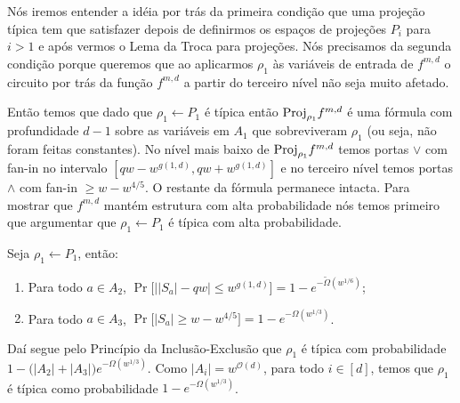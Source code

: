 Nós iremos entender a idéia por trás da primeira condição que uma projeção típica tem que satisfazer depois de definirmos os espaços de projeções $P_{i}$ para $i > 1$ e após vermos o Lema da Troca para projeções. Nós precisamos da segunda condição porque queremos que ao aplicarmos $\rho_{1}$ às variáveis de entrada de $f^{m, d}$ o circuito por trás da função $f^{m, d}$ a partir do terceiro nível não seja muito afetado.

Então temos que dado que $\rho_{1} \leftarrow P_{1}$ é típica então $\text{Proj}_{\rho_{1}}f^{m, d}$ é uma fórmula com profundidade $d - 1$ sobre as variáveis em $A_{1}$ que sobreviveram $\rho_{1}$ (ou seja, não foram feitas constantes). No nível mais baixo de $\text{Proj}_{\rho_{1}}f^{m, d}$ temos portas $\lor$ com fan-in no intervalo $[qw - w^{g(1, d)}, qw + w^{g(1, d)}]$ e no terceiro nível temos portas $\land$ com fan-in $\geq w - w^{4/5}$. O restante da fórmula permanece intacta.  Para mostrar que $f^{m, d}$ mantém estrutura com alta probabilidade nós temos primeiro que argumentar que $\rho_{1} \leftarrow P_{1}$ é típica com alta probabilidade.

\begin{prop} \label{typical_whp_P1}

Seja $\rho_{1} \leftarrow P_{1}$, então:

\begin{enumerate}

	\item Para todo $a \in A_{2}$, $\Pr \Big[\big\lvert \lvert S_{a} \rvert - qw \big\rvert \leq w^{g(1, d)} \Big] = 1 - e^{-\widetilde{\Omega}(w^{1/6})}$;
	
	\item Para todo $a \in A_{3}$, $\Pr \big[ \lvert S_{a} \rvert \geq w - w^{4/5} \big] = 1 - e^{-\Omega(w^{1/3})}$.

\end{enumerate}

Daí segue pelo Princípio da Inclusão-Exclusão que $\rho_{1}$ é típica com probabilidade $1 - \big( \lvert A_{2} \rvert + \lvert A_{3} \rvert \big)e^{-\Omega(w^{1/3})}$. Como $\lvert A_{i} \rvert = w^{\mathcal{O}(d)}$, para todo $i \in [d]$, temos que $\rho_{1}$ é típica como probabilidade $1 - e^{-\Omega(w^{1/3})}$.

\end{prop}

